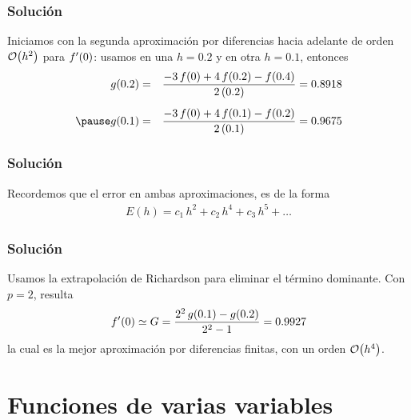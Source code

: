\begin{frame}
\frametitle{Solución}
Iniciamos con la segunda aproximación por diferencias hacia adelante de orden $\order{h^{2}}$ para ${f}^{\prime}(0)$: usamos en una $h = 0.2$ y en otra $h = 0.1$, entonces
\begin{eqnarray*}
g(0.2) &=& \dfrac{-3 \, f(0) + 4 \, f(0.2) - f(0.4)}{2 \, (0.2)} = 0.8918 \\[0.5em]
\pause
g(0.1) &=& \dfrac{-3 \, f(0) + 4 \, f(0.1) - f(0.2)}{2\, (0.1)} = 0.9675
\end{eqnarray*}
\end{frame}
\begin{frame}
\frametitle{Solución}
Recordemos que el error en ambas aproximaciones, es de la forma
\begin{align}
E(h) = c_{1} \, h^{2} + c_{2} \, h^{4} + c_{3} \, h^{5} + \ldots
\end{align}
\end{frame}
\begin{frame}
\frametitle{Solución}
Usamos la extrapolación de Richardson para eliminar el término dominante. Con $p = 2$, resulta
\begin{align*}
{f}^{\prime}(0) \simeq G = \dfrac{2^{2} \, g(0.1) - g(0.2)}{2^{2}-1} = 0.9927
\end{align*}
la cual es la mejor aproximación por diferencias finitas, con un orden $\order{h^{4}}$.
\end{frame}
\section{Funciones de varias variables}
